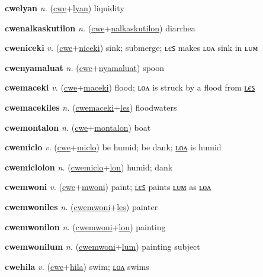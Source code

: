 \textbf{\hypertarget{cwelyan}{cwelyan}} \textit{n.} (\hyperlink{cwe}{cwe}+\allowbreak \hyperlink{lyan}{lyan})
liquidity

\textbf{\hypertarget{cwenalkaskutilon}{cwenalkaskutilon}} \textit{n.} (\hyperlink{cwe}{cwe}+\allowbreak \hyperlink{nalkaskutilon}{nalkaskutilon})
diarrhea

\textbf{\hypertarget{cweniceki}{cweniceki}} \textit{v.} (\hyperlink{cwe}{cwe}+\allowbreak \hyperlink{niceki}{niceki})
sink; submerge; ʟєꜱ makes ʟᴏᴧ sink in ʟᴜᴍ

\textbf{\hypertarget{cwenyamaluat}{cwenyamaluat}} \textit{n.} (\hyperlink{cwe}{cwe}+\allowbreak \hyperlink{nyamaluat}{nyamaluat})
spoon

\textbf{\hypertarget{cwemaceki}{cwemaceki}} \textit{v.} (\hyperlink{cwe}{cwe}+\allowbreak \hyperlink{maceki}{maceki})
flood; ʟᴏᴧ is struck by a flood from \hyperlink{cwemacekiles}{ʟєꜱ}

\textbf{\hypertarget{cwemacekiles}{cwemacekiles}} \textit{n.} (\hyperlink{cwemaceki}{cwemaceki}+\allowbreak \hyperlink{les}{les})
floodwaters

\textbf{\hypertarget{cwemontalon}{cwemontalon}} \textit{n.} (\hyperlink{cwe}{cwe}+\allowbreak \hyperlink{montalon}{montalon})
boat

\textbf{\hypertarget{cwemiclo}{cwemiclo}} \textit{v.} (\hyperlink{cwe}{cwe}+\allowbreak \hyperlink{miclo}{miclo})
be humid; be dank; \hyperlink{cwemiclolon}{ʟᴏᴧ} is humid

\textbf{\hypertarget{cwemiclolon}{cwemiclolon}} \textit{n.} (\hyperlink{cwemiclo}{cwemiclo}+\allowbreak \hyperlink{lon}{lon})
humid; dank

\textbf{\hypertarget{cwemwoni}{cwemwoni}} \textit{v.} (\hyperlink{cwe}{cwe}+\allowbreak \hyperlink{mwoni}{mwoni})
paint; \hyperlink{cwemwoniles}{ʟєꜱ} paints \hyperlink{cwemwonilum}{ʟᴜᴍ} as \hyperlink{cwemwonilon}{ʟᴏᴧ}

\textbf{\hypertarget{cwemwoniles}{cwemwoniles}} \textit{n.} (\hyperlink{cwemwoni}{cwemwoni}+\allowbreak \hyperlink{les}{les})
painter

\textbf{\hypertarget{cwemwonilon}{cwemwonilon}} \textit{n.} (\hyperlink{cwemwoni}{cwemwoni}+\allowbreak \hyperlink{lon}{lon})
painting

\textbf{\hypertarget{cwemwonilum}{cwemwonilum}} \textit{n.} (\hyperlink{cwemwoni}{cwemwoni}+\allowbreak \hyperlink{lum}{lum})
painting subject

\textbf{\hypertarget{cwehila}{cwehila}} \textit{v.} (\hyperlink{cwe}{cwe}+\allowbreak \hyperlink{hila}{hila})
swim; \hyperlink{cwehilalon}{ʟᴏᴧ} swims

